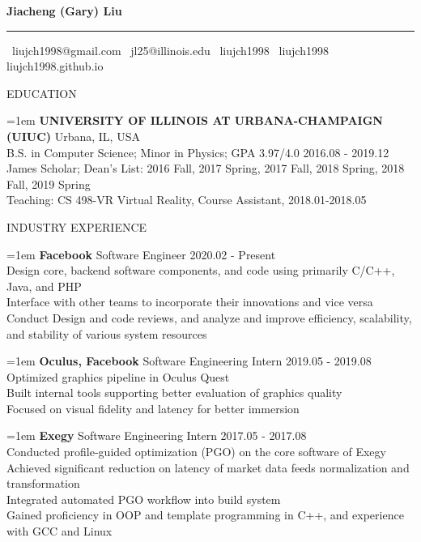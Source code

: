 \documentclass[10pt]{article}
\begin{document}
\begin{center}
    \textbf{\LARGE Jiacheng (Gary) Liu}
    \hrule
    \faEnvelope \, liujch1998@gmail.com \quad
    \faEnvelope \, jl25@illinois.edu \quad
    \faLinkedin \, liujch1998 \quad
    \faGithub \, liujch1998 \quad
    \faGithubAlt \, liujch1998.github.io
\end{center}

\vspace{1em}
{\LARGE EDUCATION}

\hangindent=1em
\textbf{UNIVERSITY OF ILLINOIS AT URBANA-CHAMPAIGN (UIUC)} \hfill Urbana, IL, USA \\
B.S. in Computer Science; Minor in Physics; GPA 3.97/4.0 \hfill 2016.08 - 2019.12 \\
James Scholar; Dean's List: 2016 Fall, 2017 Spring, 2017 Fall, 2018 Spring, 2018 Fall, 2019 Spring \\
Teaching: CS 498-VR Virtual Reality, Course Assistant, 2018.01-2018.05

\vspace{1em}
{\LARGE INDUSTRY EXPERIENCE}

\hangindent=1em
\textbf{Facebook} \hfill Software Engineer \hfill 2020.02 - Present \\
Design core, backend software components, and code using primarily C/C++, Java, and PHP \\
Interface with other teams to incorporate their innovations and vice versa \\
Conduct Design and code reviews, and analyze and improve efficiency, scalability, and stability of various system resources

\hangindent=1em
\textbf{Oculus, Facebook} \hfill Software Engineering Intern \hfill 2019.05 - 2019.08 \\
Optimized graphics pipeline in Oculus Quest \\
Built internal tools supporting better evaluation of graphics quality \\
Focused on visual fidelity and latency for better immersion

\hangindent=1em
\textbf{Exegy} \hfill Software Engineering Intern \hfill 2017.05 - 2017.08 \\
Conducted profile-guided optimization (PGO) on the core software of Exegy \\
Achieved significant reduction on latency of market data feeds normalization and transformation \\
Integrated automated PGO workflow into build system \\
Gained proficiency in OOP and template programming in C++, and experience with GCC and Linux
\end{document}
